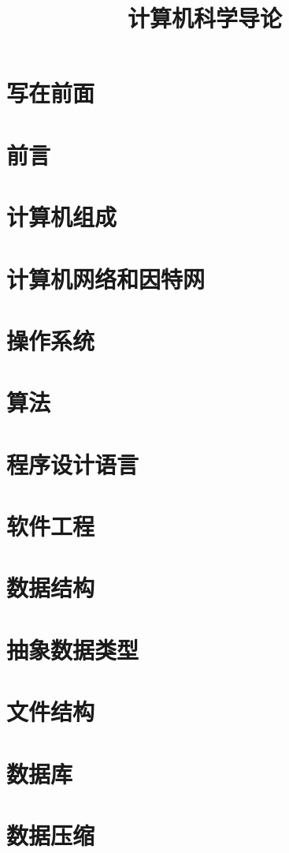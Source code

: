 \documentclass[11pt,oneside,a4paper]{book}
\title{计算机科学导论}
\begin{document}
\frontmatter
\maketitle
\chapter{写在前面}

\tableofcontents

\mainmatter
\chapter{前言}

\chapter{计算机组成}

\chapter{计算机网络和因特网}

\chapter{操作系统}

\chapter{算法}

\chapter{程序设计语言}

\chapter{软件工程}

\chapter{数据结构}

\chapter{抽象数据类型}

\chapter{文件结构}

\chapter{数据库}

\chapter{数据压缩}

\end{document}
